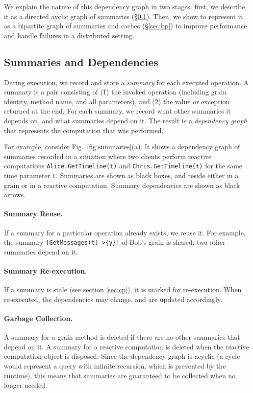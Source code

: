 We explain the nature of this dependency graph in two stages: first, we describe it as a directed ayclic graph of summaries (\S\ref{sec:summaries}). Then, we show to represent it as a bipartite graph of summaries and caches (\S\ref{sec:bp}) to improve performance and handle failures in a distributed setting. 

\subsection{Summaries and Dependencies}\label{sec:summaries}

During execution, we record and store a \emph{summary} for each executed operation. A summary is a pair consisting of (1) the invoked operation (including grain identity, method name, and all parameters), and (2) the value or exception returned at the end. For each summary, we record what other summaries it depends on, and what summaries depend on it. The result is a \emph{dependency graph} that represents the computation that was performed.

For example, consider Fig.~\ref{fig:summaries}(a). It shows a dependency graph of summaries recorded in a situation where two clients perform reactive computations \lstinline|Alice.GetTimeline(t)| and \lstinline|Chris.GetTimeline(t)| for the same time parameter \lstinline|t|. Summaries are shown as black boxes, and reside either in a grain or in a reactive computation. Summary dependencies are shown as black arrows.

\paragraph{Summary Reuse.} If a summary for a particular operation already exists, we reuse it. For example, the summary \lstinline|[GetMessages(t)->{y}]| of Bob's grain is shared: two other summaries depend on it.

\paragraph{Summary Re-execution.} If a summary is stale (see section \ref{sec:cp}), it is marked for re-execution. When re-executed, the dependencies may change, and are updated accordingly. 

\paragraph{Garbage Collection.} A summary for a grain method is deleted if there are no other summaries that depend on it.  A summary for a reactive computation is deleted when the reactive computation object is disposed. Since the dependency graph is acyclic (a cycle would represent a query with infinite recursion, which is prevented by the runtime), this means that summaries are guaranteed to be collected when no longer needed.  

